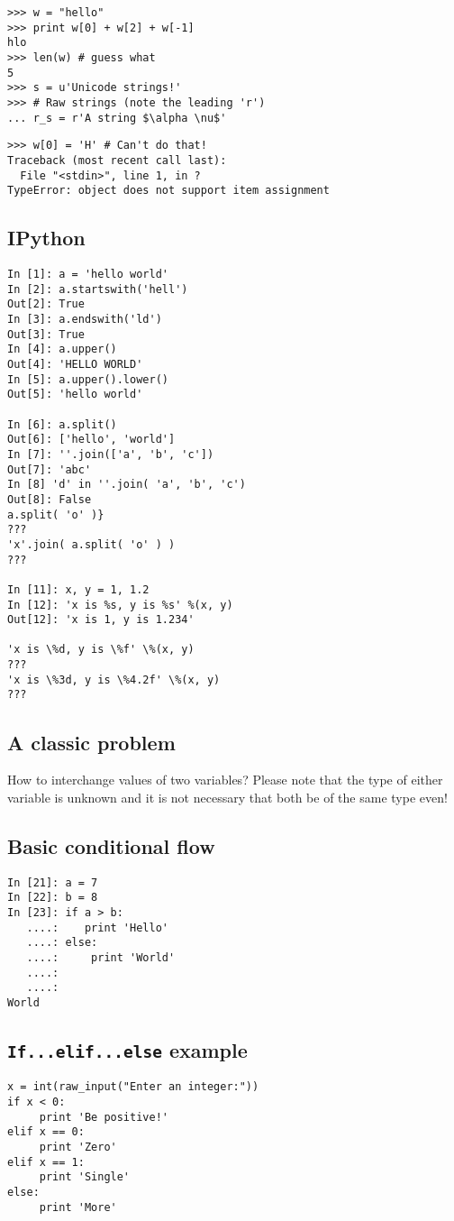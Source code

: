 \documentclass[12pt]{article}
\begin{document}
  \begin{verbatim}
>>> w = "hello"    
>>> print w[0] + w[2] + w[-1]
hlo
>>> len(w) # guess what
5
>>> s = u'Unicode strings!'
>>> # Raw strings (note the leading 'r')
... r_s = r'A string $\alpha \nu$'
  \end{verbatim}
  \begin{verbatim}
>>> w[0] = 'H' # Can't do that!
Traceback (most recent call last):
  File "<stdin>", line 1, in ?
TypeError: object does not support item assignment
  \end{verbatim}

  \subsection{IPython}
  \begin{verbatim}
In [1]: a = 'hello world'
In [2]: a.startswith('hell')
Out[2]: True
In [3]: a.endswith('ld')
Out[3]: True
In [4]: a.upper()
Out[4]: 'HELLO WORLD'
In [5]: a.upper().lower()
Out[5]: 'hello world'

In [6]: a.split()
Out[6]: ['hello', 'world']
In [7]: ''.join(['a', 'b', 'c'])
Out[7]: 'abc'
In [8] 'd' in ''.join( 'a', 'b', 'c')
Out[8]: False
a.split( 'o' )}
???
'x'.join( a.split( 'o' ) )
???

In [11]: x, y = 1, 1.2
In [12]: 'x is %s, y is %s' %(x, y)
Out[12]: 'x is 1, y is 1.234'

'x is \%d, y is \%f' \%(x, y)
???
'x is \%3d, y is \%4.2f' \%(x, y)
??? 
  \end{verbatim}

\subsection{A classic problem}
    How to interchange values of two variables? Please note that the type of either variable is unknown and it is not necessary that both be of the same type even!

\subsection{Basic conditional flow}
  \begin{verbatim}
In [21]: a = 7
In [22]: b = 8
In [23]: if a > b:
   ....:    print 'Hello'
   ....: else:
   ....:     print 'World'
   ....:
   ....:
World
  \end{verbatim}

\subsection{\texttt{If...elif...else} example}
\begin{verbatim}
x = int(raw_input("Enter an integer:"))
if x < 0:
     print 'Be positive!'
elif x == 0:
     print 'Zero'
elif x == 1:
     print 'Single'
else:
     print 'More'
\end{verbatim}
\end{document}
